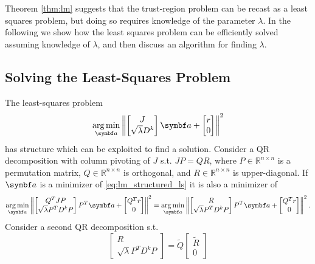 Theorem \ref{thm:lm} suggests that the trust-region problem can be recast as a least squares problem, but doing so requires knowledge of the parameter $\lambda$. In the following we show how the least squares problem can be efficiently solved assuming knowledge of $\lambda$, and then discuss an algorithm for finding $\lambda$.


\subsection{Solving the Least-Squares Problem}
\label{ssec:lm_lsq}

The least-squares problem
\begin{equation}
  \label{eq:lm_structured_ls}
  \argmin_{\a} \left\| \begin{bmatrix} J \\ \sqrt{\lambda} D^k \end{bmatrix} \a + \begin{bmatrix} r \\ 0 \end{bmatrix} \right\|^2
\end{equation}
has structure which can be exploited to find a solution. Consider a QR decomposition with column pivoting of $J$ s.t. $J P = Q R$, where $P \in \mathbb{R}^{n \times n}$ is a permutation matrix, $Q \in \mathbb{R}^{n \times n}$ is orthogonal, and $R \in \mathbb{R}^{n \times n}$ is upper-diagonal. If $\a$ is a minimizer of \eqref{eq:lm_structured_ls} it is also a minimizer of
\begin{equation}
  \label{eq:lm_structured_ls}
  \argmin_{\a} \left\| \begin{bmatrix} Q^{T} J P \\ \sqrt{\lambda} P^{T} D^k P \end{bmatrix} P^{T} \a + \begin{bmatrix} Q^{T} r \\ 0 \end{bmatrix} \right\|^2 =     \argmin_{\a} \left\| \begin{bmatrix} R \\ \sqrt{\lambda} P^{T} D^k P \end{bmatrix} P^{T} \a + \begin{bmatrix} Q^{T} r \\ 0 \end{bmatrix} \right\|^2.
\end{equation}
Consider a second QR decomposition s.t.
\begin{equation}
  \label{eq:lm_qr}
  \begin{bmatrix}
    R \\ \sqrt{\lambda} P^{T} D^{k} P
  \end{bmatrix} = \tilde Q \begin{bmatrix} \tilde R \\ 0 \end{bmatrix}
\end{equation}

